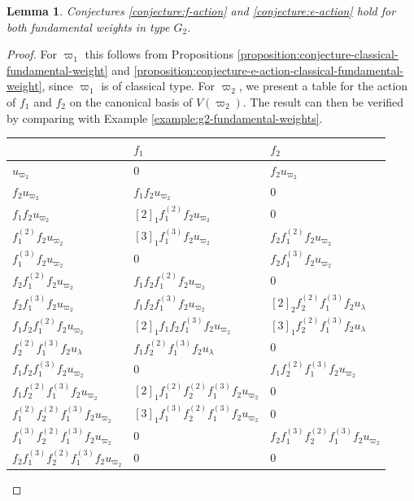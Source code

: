 \documentclass[final]{amsart}
\theoremstyle{plain}
\newtheorem{lemma}[corollary]{Lemma}
\theoremstyle{definition}
\begin{document}
\begin{lemma}
    \label{lemma:conjecture-g2-fundamental-weights}
    Conjectures \ref{conjecture:f-action} and \ref{conjecture:e-action} hold for both fundamental weights in type $G_2$.
\end{lemma}
\begin{proof}
    For $\varpi_1$ this follows from Propositions \ref{proposition:conjecture-classical-fundamental-weight} and \ref{proposition:conjecture-e-action-classical-fundamental-weight}, since $\varpi_1$ is of classical type.
    For $\varpi_2$, we present a table for the action of $f_1$ and $f_2$ on the canonical basis of $V(\varpi_2)$.
    The result can then be verified by comparing with Example \ref{example:g2-fundamental-weights}.
    \begin{table}[H]
        \begin{tabular}{l|l|l}
            & $f_1$ & $f_2$ \\
            \hline
            $u_{\varpi_2}$ & 0 & $f_2 u_{\varpi_2}$ \\
            $f_2 u_{\varpi_2}$ & $f_1 f_2 u_{\varpi_2}$ & $0$ \\
            $f_1 f_2 u_{\varpi_2}$ & $[2]_1 f_1^{(2)} f_2 u_{\varpi_2}$ & $0$ \\
            $f_1^{(2)} f_2 u_{\varpi_2}$ & $[3]_1 f_1^{(3)} f_2 u_{\varpi_2}$ & $f_2 f_1^{(2)} f_2 u_{\varpi_2}$ \\
            $f_1^{(3)} f_2 u_{\varpi_2}$ & $0$ & $f_2 f_1^{(3)} f_2 u_{\varpi_2}$ \\
            $f_2 f_1^{(2)} f_2 u_{\varpi_2}$ & $f_1 f_2 f_1^{(2)} f_2 u_{\varpi_2}$ & $0$ \\
            $f_2 f_1^{(3)} f_2 u_{\varpi_2}$ & $f_1 f_2 f_1^{(3)} f_2 u_{\varpi_2}$ & $[2]_2 f_2^{(2)} f_1^{(3)} f_2 u_\lambda$ \\
            $f_1 f_2 f_1^{(2)} f_2 u_{\varpi_2}$ & $[2]_1 f_1 f_2 f_1^{(3)} f_2 u_{\varpi_2}$ & $[3]_1 f_2^{(2)} f_1^{(3)} f_2 u_\lambda$ \\
            $f_2^{(2)} f_1^{(3)} f_2 u_\lambda$ & $f_1 f_2^{(2)} f_1^{(3)} f_2 u_\lambda$ & $0$ \\
            $f_1 f_2 f_1^{(3)} f_2 u_{\varpi_2}$ & $0$ & $f_1 f_2^{(2)} f_1^{(3)} f_2 u_{\varpi_2}$ \\
            $f_1 f_2^{(2)} f_1^{(3)} f_2 u_{\varpi_2}$ & $[2]_1 f_1^{(2)} f_2^{(2)} f_1^{(3)} f_2 u_{\varpi_2}$ & $0$ \\
            $f_1^{(2)} f_2^{(2)} f_1^{(3)} f_2 u_{\varpi_2}$ & $[3]_1 f_1^{(3)} f_2^{(2)} f_1^{(3)} f_2 u_{\varpi_2}$ & $0$ \\
            $f_1^{(3)} f_2^{(2)} f_1^{(3)} f_2 u_{\varpi_2}$ & $0$ & $f_2 f_1^{(3)} f_2^{(2)} f_1^{(3)} f_2 u_{\varpi_2}$ \\
            $f_2 f_1^{(3)} f_2^{(2)} f_1^{(3)} f_2 u_{\varpi_2}$ & $0$ & $0$
        \end{tabular}
    \end{table}
\end{proof}
\end{document}
